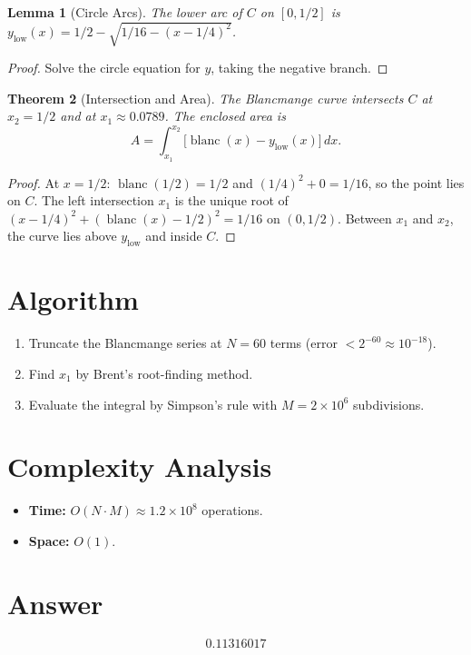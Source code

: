 \documentclass[12pt]{article}
\newtheorem{theorem}{Theorem}
\newtheorem{lemma}[theorem]{Lemma}
\begin{document}
\begin{lemma}[Circle Arcs]
The lower arc of $C$ on $[0, 1/2]$ is $y_{\text{low}}(x) = 1/2 - \sqrt{1/16 - (x - 1/4)^2}$.
\end{lemma}
\begin{proof}
Solve the circle equation for $y$, taking the negative branch.
\end{proof}

\begin{theorem}[Intersection and Area]
The Blancmange curve intersects $C$ at $x_2 = 1/2$ and at $x_1 \approx 0.0789$. The enclosed area is
\[
A = \int_{x_1}^{x_2}\bigl[\operatorname{blanc}(x) - y_{\text{low}}(x)\bigr]\,dx.
\]
\end{theorem}
\begin{proof}
At $x = 1/2$: $\operatorname{blanc}(1/2) = 1/2$ and $(1/4)^2 + 0 = 1/16$, so the point lies on $C$. The left intersection $x_1$ is the unique root of $(x - 1/4)^2 + (\operatorname{blanc}(x) - 1/2)^2 = 1/16$ on $(0, 1/2)$. Between $x_1$ and $x_2$, the curve lies above $y_{\text{low}}$ and inside $C$.
\end{proof}

\section{Algorithm}
\begin{enumerate}
\item Truncate the Blancmange series at $N = 60$ terms (error $< 2^{-60} \approx 10^{-18}$).
\item Find $x_1$ by Brent's root-finding method.
\item Evaluate the integral by Simpson's rule with $M = 2 \times 10^6$ subdivisions.
\end{enumerate}

\section{Complexity Analysis}
\begin{itemize}
\item \textbf{Time:} $O(N \cdot M) \approx 1.2 \times 10^8$ operations.
\item \textbf{Space:} $O(1)$.
\end{itemize}

\section{Answer}

\[
\boxed{0.11316017}
\]
\end{document}
